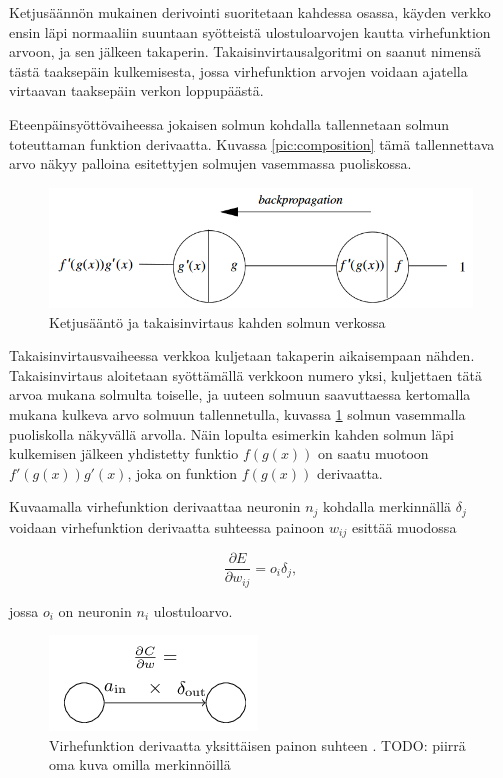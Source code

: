 \documentclass[finnish]{tktltiki2}
\theoremstyle{definition}
\theoremstyle{remark}
\begin{document}
  Ketjusäännön mukainen derivointi suoritetaan kahdessa osassa, käyden verkko ensin läpi normaaliin suuntaan syötteistä ulostuloarvojen kautta virhefunktion arvoon, ja sen jälkeen takaperin. Takaisinvirtausalgoritmi on saanut nimensä tästä taaksepäin kulkemisesta, jossa virhefunktion arvojen voidaan ajatella virtaavan taaksepäin verkon loppupäästä.
  
  Eteenpäinsyöttövaiheessa jokaisen solmun kohdalla tallennetaan solmun toteuttaman funktion derivaatta. Kuvassa \ref{pic:composition} tämä tallennettava arvo näkyy palloina esitettyjen solmujen vasemmassa puoliskossa.

  \begin{figure}[h]
    \centering
    \includegraphics[scale=0.5]{backpropagation}
    \caption{Ketjusääntö ja takaisinvirtaus kahden solmun verkossa \cite{Rojas96}}
    \label{pic:backpropagation}
  \end{figure}

  Takaisinvirtausvaiheessa verkkoa kuljetaan takaperin aikaisempaan nähden. Takaisinvirtaus aloitetaan syöttämällä verkkoon numero yksi, kuljettaen tätä arvoa mukana solmulta toiselle, ja uuteen solmuun saavuttaessa kertomalla mukana kulkeva arvo solmuun tallennetulla, kuvassa \ref{pic:backpropagation} solmun vasemmalla puoliskolla näkyvällä arvolla. Näin lopulta esimerkin kahden solmun läpi kulkemisen jälkeen yhdistetty funktio $f(g(x))$ on saatu muotoon $f'(g(x))g'(x)$, joka on funktion $f(g(x))$ derivaatta. 

  Kuvaamalla virhefunktion derivaattaa neuronin $n_j$ kohdalla merkinnällä $\delta_j$ voidaan virhefunktion derivaatta suhteessa painoon $w_{ij}$ esittää muodossa 

    $$ \frac{\partial E}{\partial w_{ij}} = o_i\delta_j,$$

  jossa $o_i$ on neuronin $n_i$ ulostuloarvo.

  \begin{figure}[h]
    \centering
    \includegraphics[scale=0.8]{cost-derivative}
    \caption{Virhefunktion derivaatta yksittäisen painon suhteen \cite{Nielsen-neural}. TODO: piirrä oma kuva omilla merkinnöillä}
    \label{pic:cost-weight-derivative}
  \end{figure}
\end{document}
